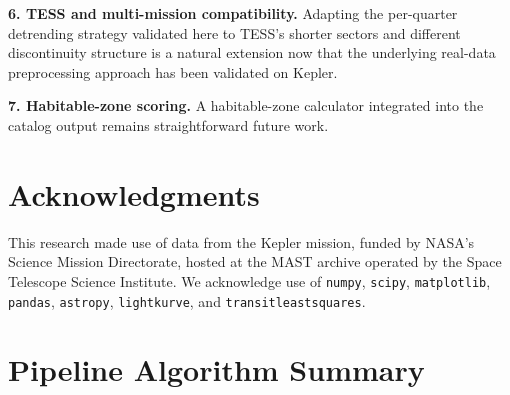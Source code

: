 \documentclass[11pt]{article}
\begin{document}
\textbf{6. TESS and multi-mission compatibility.} Adapting the per-quarter detrending strategy validated here to TESS's shorter sectors and different discontinuity structure is a natural extension now that the underlying real-data preprocessing approach has been validated on Kepler.

\textbf{7. Habitable-zone scoring.} A \citet{Kopparapu2013} habitable-zone calculator integrated into the catalog output remains straightforward future work.

\section*{Acknowledgments}
This research made use of data from the Kepler mission, funded by NASA's Science Mission Directorate, hosted at the MAST archive operated by the Space Telescope Science Institute. We acknowledge use of \texttt{numpy}, \texttt{scipy}, \texttt{matplotlib}, \texttt{pandas}, \texttt{astropy}, \texttt{lightkurve}, and \texttt{transitleastsquares}.

\appendix

\section{Pipeline Algorithm Summary}
\end{document}

